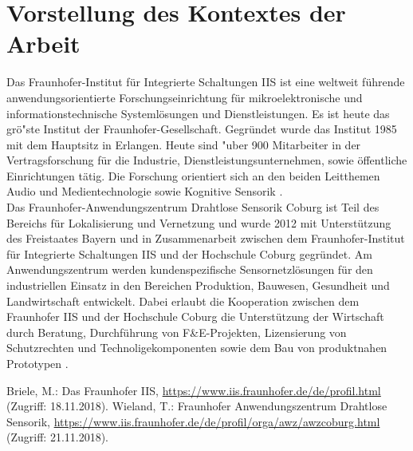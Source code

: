 \documentclass[a4paper,12pt,onesided]{report}
\begin{document}
\section{Vorstellung des Kontextes der Arbeit}
Das Fraunhofer-Institut f\"ur Integrierte Schaltungen IIS ist eine weltweit f\"uhrende anwendungsorientierte
Forschungseinrichtung f\"ur mikroelektronische und informationstechnische
Systeml\"osungen und Dienstleistungen. 
Es ist heute das gr\"o"ste Institut der Fraunhofer-Gesellschaft. Gegr\"undet wurde das Institut 1985 mit dem Hauptsitz in Erlangen. Heute
sind "uber 900 Mitarbeiter in der Vertragsforschung f\"ur die Industrie, Dienstleistungsunternehmen, 
sowie \"offentliche Einrichtungen t\"atig. Die Forschung orientiert sich an den beiden Leitthemen Audio und Medientechnologie sowie Kognitive Sensorik \cite{briele}.\\

Das Fraunhofer-Anwendungszentrum Drahtlose Sensorik Coburg ist Teil des Bereichs f\"ur
Lokalisierung und Vernetzung und wurde 2012 mit Unterst\"utzung des Freistaates Bayern
und in Zusammenarbeit zwischen dem Fraunhofer-Institut f\"ur Integrierte Schaltungen
IIS und der Hochschule Coburg gegr\"undet. Am Anwendungszentrum werden kundenspezifische
Sensornetzl\"osungen f\"ur den industriellen Einsatz in den Bereichen Produktion,
Bauwesen, Gesundheit und Landwirtschaft entwickelt. Dabei erlaubt die Kooperation zwischen
dem Fraunhofer IIS und der Hochschule Coburg die Unterst\"utzung der Wirtschaft
durch Beratung, Durchf\"uhrung von F\&E-Projekten, Lizensierung von Schutzrechten und
Technoligekomponenten sowie dem Bau von produktnahen Prototypen \cite{wieland}.\\
\begin{thebibliography}{9}
  Briele, M.: Das Fraunhofer IIS, \url{https://www.iis.fraunhofer.de/de/profil.html} 
  (Zugriff: 18.11.2018).
  Wieland, T.: Fraunhofer Anwendungszentrum Drahtlose Sensorik, \url{https://www.iis.fraunhofer.de/de/profil/orga/awz/awzcoburg.html}
  (Zugriff: 21.11.2018).
\end{thebibliography}
\end{document}
